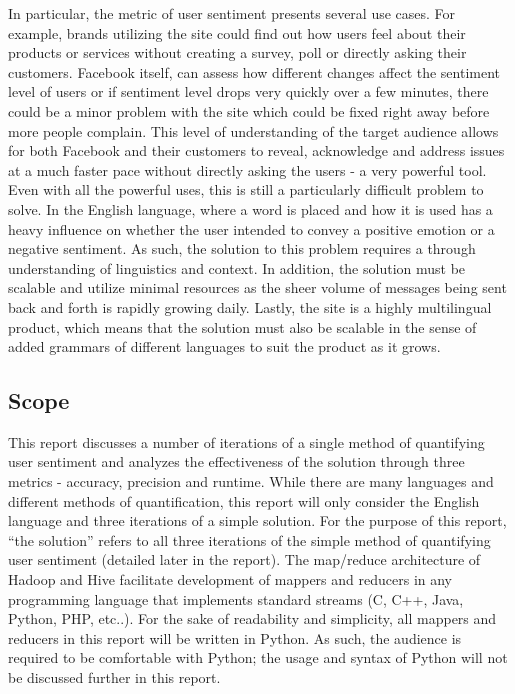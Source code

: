 In particular, the metric of user sentiment presents several use cases.  For example, brands utilizing the site could find out how users feel about their products or services without creating a survey, poll or directly asking their customers. Facebook itself, can assess how different changes affect the sentiment level of users or if sentiment level drops very quickly over a few minutes, there could be a minor problem with the site which could be fixed right away before more people complain.  This level of understanding of the target audience allows for both Facebook and their customers to reveal, acknowledge and address issues at a much faster pace without directly asking the users - a very powerful tool. Even with all the powerful uses, this is still a particularly difficult problem to solve. In the English language, where a word is placed and how it is used has a heavy influence on whether the user intended to convey a positive emotion or a negative sentiment. \cite{dahlgreen} As such, the solution to this problem requires a through understanding of linguistics and context.  In addition, the solution must be scalable and utilize minimal resources as the sheer volume of messages being sent back and forth is rapidly growing daily.  Lastly, the site is a highly multilingual product, which means that the solution must also be scalable in the sense of added grammars of different languages to suit the product as it grows.

	\subsection{Scope} %
	\label{sub:scope}
This report discusses a number of iterations of a single method of quantifying user sentiment and analyzes the effectiveness of the solution through three metrics - accuracy, precision and runtime. While there are many languages and different methods of quantification, this report will only consider the English language and three iterations of a simple solution.  For the purpose of this report, ``the solution'' refers to all three iterations of the simple method of quantifying user sentiment (detailed later in the report).  The map/reduce architecture of Hadoop and Hive facilitate development of mappers and reducers in any programming language that implements standard streams (C, C++, Java, Python, PHP, etc..).  For the sake of readability and simplicity, all mappers and reducers in this report will be written in Python.  As such, the audience is required to be comfortable with Python; the usage and syntax of Python will not be discussed further in this report.

